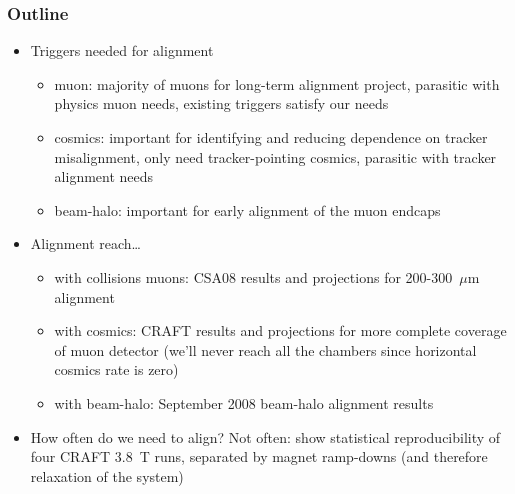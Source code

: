 \documentclass[compress]{beamer}
\begin{document}
\begin{frame}
\frametitle{Outline}
\begin{itemize}
\item Triggers needed for alignment
\begin{itemize}
\item muon: majority of muons for long-term alignment project, parasitic with physics muon needs, existing triggers satisfy our needs
\item cosmics: important for identifying and reducing dependence on tracker misalignment, only need tracker-pointing cosmics, parasitic with tracker alignment needs
\item beam-halo: important for early alignment of the muon endcaps
\end{itemize}

\item Alignment reach\ldots
\begin{itemize}
\item with collisions muons: CSA08 results and projections for 200-300~$\mu$m alignment
\item with cosmics: CRAFT results and projections for
  more complete coverage of muon detector (we'll never reach all the
  chambers since horizontal cosmics rate is zero)
\item with beam-halo: September 2008 beam-halo alignment results
\end{itemize}

\item How often do we need to align?  Not often: show statistical
  reproducibility of four CRAFT 3.8~T runs, separated by magnet
  ramp-downs (and therefore relaxation of the system)

\end{itemize}
\end{frame}
\end{document}
